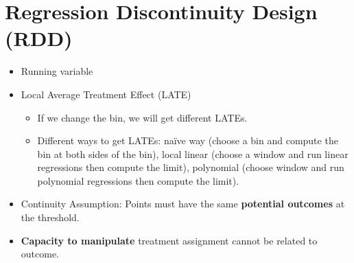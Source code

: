 \documentclass[10pt, letterpaper]{article}
\begin{document}
\section{Regression Discontinuity Design (RDD)}
\begin{itemize}
	\item Running variable
	\item Local Average Treatment Effect (LATE)
	\begin{itemize}
		\item If we change the bin, we will get different LATEs.
		\item Different ways to get LATEs: naïve way (choose a bin and compute the bin at both sides of the bin), local linear (choose a window and run linear regressions then compute the limit), polynomial (choose window and run polynomial regressions then compute the limit). 
	\end{itemize}
	\item Continuity Assumption: Points must have the same \textbf{potential outcomes} at the threshold. 
	\item \textbf{Capacity to manipulate} treatment assignment cannot be related to outcome.
\end{itemize}
\end{document}
